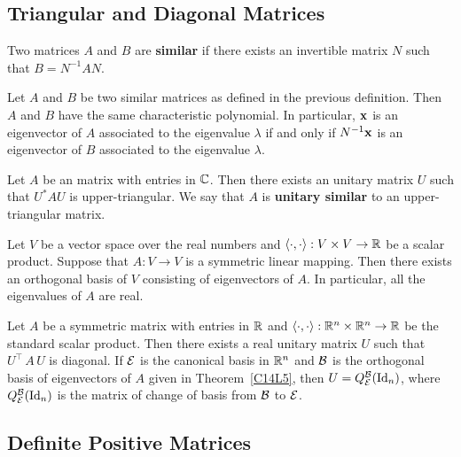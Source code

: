 \subsection{Triangular and Diagonal Matrices}

\begin{defn}
Two  matrices $A$ and $B$ are
{\bfseries similar} if there exists an
invertible  matrix $N$ such that $B = N^{-1} A N$.
\end{defn}

\begin{theorem}
Let $A$ and $B$ be two similar  matrices as defined in the
previous definition.  Then $A$ and $B$ have the
same characteristic polynomial.  In particular, $\mathbf{x}$ is an eigenvector
of $A$ associated to the eigenvalue $\lambda$ if and only if $N^{-1}\mathbf{x}$
is an eigenvector of $B$ associated to the eigenvalue $\lambda$.
\end{theorem}

\begin{theorem}
Let $A$ be an  matrix with entries in $\mathbb{C}$.  Then there exists an
unitary matrix $U$ such that $U^\ast A U$ is upper-triangular.  We say that
$A$ is {\bfseries unitary similar} to
an upper-triangular matrix.
\end{theorem}

\begin{theorem}
Let $V$ be a vector space over the real numbers and
$\left\langle{\cdot} , {\cdot}\right\rangle:V \times V \rightarrow \mathbb{R}$ be a scalar product.  Suppose
that $A:V \rightarrow V$ is a symmetric linear mapping.  Then there exists an
orthogonal basis of $V$ consisting of eigenvectors of $A$.  In particular,
all the eigenvalues of $A$ are real.
\label{C14L5}
\end{theorem}

\begin{cor}
Let $A$ be a  symmetric matrix with entries in $\mathbb{R}$ and
$\left\langle{\cdot} , {\cdot}\right\rangle:\mathbb{R}^n \times \mathbb{R}^n \to \mathbb{R}$ be the standard scalar
product.  Then there exists a real unitary matrix $U$ such that
$U^{\top}\,A\,U$ is diagonal.  If $\mathcal{E}$ is the canonical basis in
$\mathbb{R}^n$ and $\mathcal{B}$ is the orthogonal basis of eigenvectors of $A$ given
in Theorem~\ref{C14L5},  then $U = Q_{\mathcal{E}}^{\mathcal{B}}(\operatorname{Id}_n)$, where
$Q_{\mathcal{E}}^{\mathcal{B}}(\operatorname{Id}_n)$ is the matrix of change of basis from $\mathcal{B}$ to
$\mathcal{E}$.
\end{cor}

\subsection{Definite Positive Matrices}

